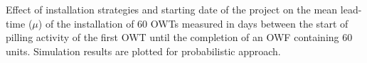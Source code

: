 \label{fig:strategies}
Effect of installation strategies and starting date of the project on the mean lead-time ($\mu$) of the installation of 60 OWTs measured in days between the start of pilling activity of the first OWT until the completion of an OWF containing 60 units. Simulation results are plotted for probabilistic approach.
